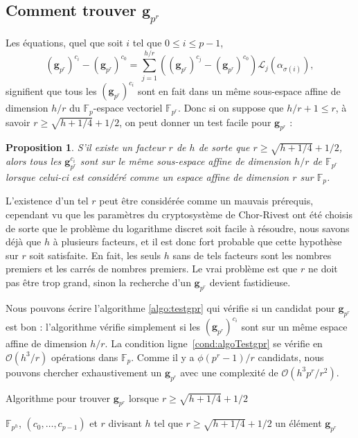 \documentclass[a4paper, titlepage, 11pt]{article}
\newtheorem{prop}[theo]{Proposition}
\theoremstyle{definition}
\theoremstyle{remark}
\def\O{\mathcal O}
\def\gf #1{\mathbb{F}_{#1}}
\def\mbf #1{\mathbf{#1}}
\begin{document}
\subsection{Comment trouver $\mbf g_{p^r}$}

Les équations, quel que soit $i$ tel que $0\leqslant i \leqslant p-1$,
$$(\mbf g_{p^r})^{c_i} - (\mbf g_{p^r})^{c_{0}} = \sum_{j=1}^{h/r} \left((\mbf g_{p^r})^{c_{j}} - (\mbf g_{p^r})^{c_{0}} \right) \mathcal L_j(\alpha_{\sigma(i)}),$$
signifient que tous les $(\mbf g_{p^r})^{c_i}$ sont en fait dans un même sous-espace affine de dimension $h/r$ du $\gf{p}$-espace vectoriel $\gf{p^r}$. Donc si on suppose que $h/r + 1 \leqslant r$, à savoir $r \geqslant \sqrt{h + 1/4} + 1/2$, on peut donner un test facile pour $\mbf g_{p^r}$ :

\begin{prop}
S'il existe un facteur $r$ de $h$ de sorte que $r \geqslant \sqrt{h + 1/4} + 1/2$, alors tous les $\mbf g_{p^r}^{c_i}$ sont sur le même sous-espace affine de dimension $h/r$ de $\gf{p^r}$ lorsque celui-ci est considéré comme un espace affine de dimension $r$ sur $\gf{p}$.
\end{prop}

L'existence d'un tel $r$ peut être considérée comme un mauvais prérequis, cependant vu que les paramètres du cryptosystème de Chor-Rivest ont été choisis de sorte que le problème du logarithme discret soit facile à résoudre, nous savons déjà que $h$ à plusieurs facteurs, et il est donc fort probable que cette hypothèse sur $r$ soit satisfaite. En fait, les seuls $h$ sans de tels facteurs sont les nombres premiers et les carrés de nombres premiers. Le vrai problème est que $r$ ne doit pas être trop grand, sinon la recherche d'un $\mbf g_{p^r}$  devient fastidieuse.

Nous pouvons écrire l'algorithme \ref{algo:testgpr} qui vérifie si un candidat pour $\mbf g_{p^r}$ est bon : l'algorithme vérifie simplement si les $(\mbf g_{p^r})^{c_i}$ sont sur un même espace affine de dimension $h/r$. La condition ligne~\ref{cond:algoTestgpr} se vérifie en $\O(h^3/r)$ opérations dans $\gf{p}$. Comme il y a $\phi(p^r-1)/r$ candidats, nous pouvons chercher exhaustivement un $\mbf g_{p^r}$ avec une complexité de $\O(h^3p^r/r^2)$.

\begin{algorithm}[h]
\caption{Algorithme pour trouver $\mbf g_{p^r}$ lorsque $r\geqslant \sqrt{h + 1/4} + 1/2$}
\label{algo:testgpr}
\begin{algorithmic}[1]
\REQUIRE $\gf{p^h}$, $(c_0,\dots, c_{p-1})$ et $r$ divisant $h$ tel que $r\geqslant \sqrt{h + 1/4} + 1/2$
\ENSURE un élément $\mbf g_{p^r}$
\FORALL{$\zeta \in \gf{p^h}$ générateur de $\gf{p^r}^\times$} \label{boucle:algoTestgpr}
		\label{cond:algoTestgpr}
		\ENDIF
	\ENDFOR
	\RETURN{$\zeta$}
\ENDFOR
\end{algorithmic}
\end{algorithm}
\end{document}
